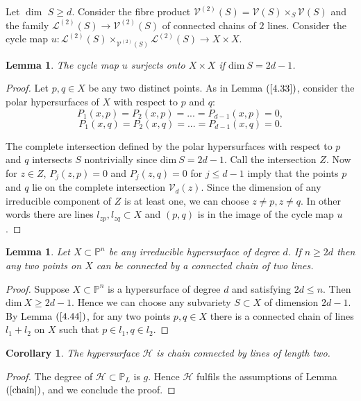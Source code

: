 \documentclass[12pt, reqno]{amsart}
\newtheorem{lemma}[theorem]{Lemma}
\newtheorem{corollary}[theorem]{Corollary}
\begin{document}
Let $\dim$ $S\geq d$. Consider the fibre product $\mathcal{V}^{(2)}(S)=\mathcal{V}(S)\times_S\mathcal{V}(S)$ and the family
$\mathcal{L}^{(2)}(S)\longrightarrow \mathcal{V}^{(2)}(S)$ of connected 
chains of $2$ lines. Consider the cycle map $u:\mathcal{L}^{(2)}(S)\times_{\mathcal{V}^{(2)}(S)}\mathcal{L}^{(2)}(S)\longrightarrow X\times X$.
\begin{lemma}\label{4.44}
The cycle map $u$ surjects onto $ X \times X$ if $\mbox{dim}~S= 2d-1$.
\end{lemma}
\begin{proof} Let $p,q\in X$ be any two distinct points.
As in Lemma $(\ref{4.33})$, consider the polar hypersurfaces of $X$ with respect to $p$ and 
$q$:
$$P_1(x,p)=P_2(x,p)=...=P_{d-1}(x,p)=0,$$
$$P_1(x,q)=P_2(x,q)=...=P_{d-1}(x,q)=0.$$

The complete intersection defined by the polar hypersurfaces with respect to $p$ 
and $q$ intersects $S$ nontrivially since $\mbox{dim}~S=2d-1$. Call the
intersection $Z$. Now for $z\in Z$, $P_j(z,p)=0$ and 
$P_j(z,q)=0$ for $j\leq d-1$ imply that 
the points $p$ and $q$ lie on the complete intersection 
$\mathcal{V}_{d}(z)$. Since the dimension of any irreducible component of $Z$ is at least one, we can choose $z\neq p,z\neq q$.
In other words there are lines $l_{zp},l_{zq}\subset X$ and $(p,q)$ is in the
image of the cycle map $u$. 
\end{proof}


\begin{lemma}\label{chain}
Let $X\subset\mathbb{P}^n$ be any irreducible hypersurface of degree $d$. If $n\geq 2d$ then any 
two points on $X$ can be connected by a connected chain of two lines. 
\end{lemma}
\begin{proof} Suppose $X\subset \mathbb{P}^n$ is a hypersurface of
degree $d$ and satisfying $2d\leq n$. Then $\mbox{dim}~X\geq 2d-1$. Hence we can choose any subvariety 
$S\subset X$ of dimension $2d-1$.
By Lemma $(\ref{4.44})$, for any two points $p,q\in X$ there is a connected chain
of lines $l_1+l_2$ on $X$ such that $p\in l_1,q\in l_2$. 
\end{proof}

\begin{corollary}\label{chainH}
The hypersurface $\mathcal{H}$ is chain connected by lines of length two.
\end{corollary}
\begin{proof}
The degree of $\mathcal{H} \subset \mathbb{P}_L$ is $g$. Hence $\mathcal{H}$ fulfils the assumptions of Lemma $(\ref{chain})$, and we conclude the proof.
\end{proof}
\end{document}
